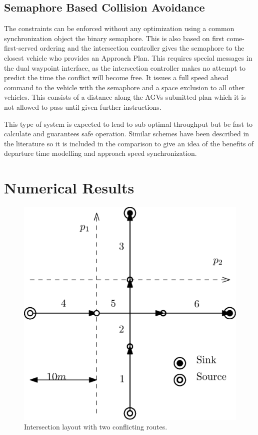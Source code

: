  
\subsection{Semaphore Based Collision Avoidance}
The constraints can be enforced without any optimization using a common synchronization object the binary semaphore. This is also based on first come-first-served ordering and the intersection controller gives the semaphore to the closest vehicle who provides an Approach Plan. This requires special messages in the dual waypoint interface, as the intersection controller makes no attempt to predict the time the conflict will become free. It issues a full speed ahead command to the vehicle with the semaphore and a space exclusion to all other vehicles. This consists of a distance along the AGVs submitted plan which it is not allowed to pass until given further instructions. 

This type of system is expected to lead to sub optimal throughput but be fast to calculate and guarantees safe operation. Similar schemes have been described in the literature so it is included in the comparison to give an idea of the benefits of departure time modelling and approach speed synchronization. 

\section{Numerical Results}

\begin{figure}[ht]
\centering
\includegraphics[width=0.9\linewidth]{intersection_topo}
\caption{Intersection layout with two conflicting routes.}
\label{fig:intersection_topo}
\end{figure}

